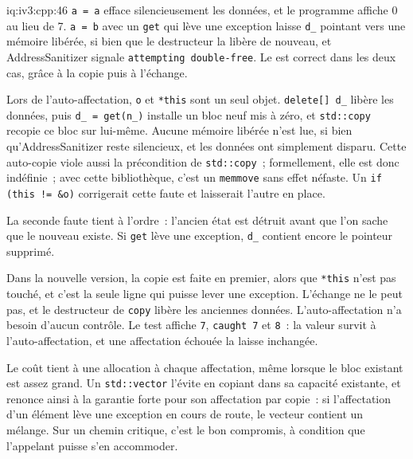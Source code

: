 \begin{solution}{iq:iv3:cpp:46}
\texttt{a = a} efface silencieusement les données, et le programme affiche 0 au lieu de 7. \texttt{a = b} avec un \texttt{get} qui lève une exception laisse \texttt{d\_} pointant vers une mémoire libérée, si bien que le destructeur la libère de nouveau, et AddressSanitizer signale \texttt{attempting double-free}. Le  est correct dans les deux cas, grâce à la copie puis à l'échange.
\enlargethispage{-3\baselineskip}%
\label{lst:iv3:cp:assigngood}

Lors de l'auto-affectation, \texttt{o} et \texttt{*this} sont un seul objet. \texttt{delete[] d\_} libère les données, puis \texttt{d\_ = get(n\_)} installe un bloc neuf mis à zéro, et \texttt{std::copy} recopie ce bloc sur lui-même. Aucune mémoire libérée n'est lue, si bien qu'AddressSanitizer reste silencieux, et les données ont simplement disparu. Cette auto-copie viole aussi la précondition de \texttt{std::copy}~; formellement, elle est donc indéfinie~; avec cette bibliothèque, c'est un \texttt{memmove} sans effet néfaste. Un \texttt{if (this != \&o)} corrigerait cette faute et laisserait l'autre en place.

La seconde faute tient à l'ordre~: l'ancien état est détruit avant que l'on sache que le nouveau existe. Si \texttt{get} lève une exception, \texttt{d\_} contient encore le pointeur supprimé.

Dans la nouvelle version, la copie est faite en premier, alors que \texttt{*this} n'est pas touché, et c'est la seule ligne qui puisse lever une exception. L'échange ne le peut pas, et le destructeur de \texttt{copy} libère les anciennes données. L'auto-affectation n'a besoin d'aucun contrôle. Le test affiche \texttt{7}, \texttt{caught 7} et \texttt{8}~: la valeur survit à l'auto-affectation, et une affectation échouée la laisse inchangée.

Le coût tient à une allocation à chaque affectation, même lorsque le bloc existant est assez grand. Un \texttt{std::vector} l'évite en copiant dans sa capacité existante, et renonce ainsi à la garantie forte pour son affectation par copie~: si l'affectation d'un élément lève une exception en cours de route, le vecteur contient un mélange. Sur un chemin critique, c'est le bon compromis, à condition que l'appelant puisse s'en accommoder.

\end{solution}

